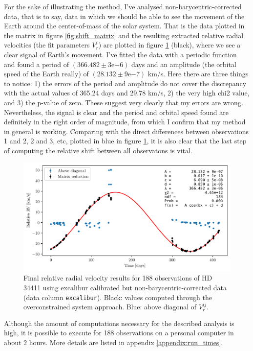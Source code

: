     For the sake of illustrating the method, I've analysed non-barycentric-corrected data, that is to say, data in which we should be able to see the movement of the Earth around the center-of-mass of the solar system. That is the data plotted in the matrix in figure \ref{fig:shift_matrix} and the resulting extracted relative radial velocities (the fit parameters $V_r^i$) are plotted in figure \ref{fig:RV_results_non_barycentric} (black), where we see a clear signal of Earth's movement. I've fitted the data with a periodic function and found a  period of $(366.482 \pm 3\mathrm{e}{-6})$ days and an amplitude (the orbital speed of the Earth really) of $(28.132 \pm 9\mathrm{e}{-7})$ km/s. Here there are three things to notice: 1) the errors of the period and amplitude do not cover the discrepancy with the actual values of 365.24 days and 29.78 km/s, 2) the very high chi2 value, and 3) the p-value of zero. These suggest very clearly that my errors are wrong. Nevertheless, the signal is clear and the period and orbital speed found are definitely in the right order of magnitude, from which I confirm that my method in general is working. Comparing with the direct differences between observations 1 and 2, 2 and 3, etc, plotted in blue in figure \ref{fig:RV_results_non_barycentric}, it is also clear that the last step of computing the relative shift between all observatons is vital. 

    \begin{figure}%
        \begin{wide}  
            \includegraphics[width=\textwidth]{figures/shift_non_bary_centric.pdf}
            \caption{Final relative radial velocity results for 188 observations of HD 34411 using excalibur calibrated but non-barycentric-corrected data (data column \texttt{excalibur}). Black: values computed through the overconstrained system approach. Blue: above diagonal of $V_r^{ij}$.}
            \label{fig:RV_results_non_barycentric}
        \end{wide}
    \end{figure}

    Although the amount of computations necessary for the described analysis is high, it is possible to execute for 188 observations on a personal computer in about 2 hours. More details are listed in appendix \ref{appendix:run_times}.
    

